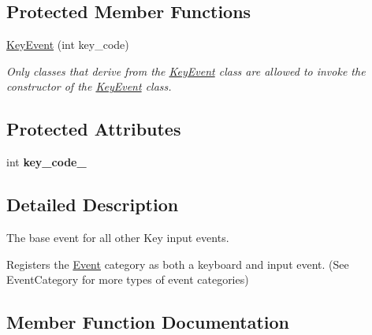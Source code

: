 \subsection*{Protected Member Functions}
\begin{DoxyCompactItemize}
\item 
\mbox{\label{classengine_1_1events_1_1KeyEvent_a621562a39051187801b6f7259542a04f}} 
\hyperlink{classengine_1_1events_1_1KeyEvent_a621562a39051187801b6f7259542a04f}{Key\+Event} (int key\+\_\+code)
\begin{DoxyCompactList}\small\item\em Only classes that derive from the \hyperlink{classengine_1_1events_1_1KeyEvent}{Key\+Event} class are allowed to invoke the constructor of the \hyperlink{classengine_1_1events_1_1KeyEvent}{Key\+Event} class. \end{DoxyCompactList}\end{DoxyCompactItemize}
\subsection*{Protected Attributes}
\begin{DoxyCompactItemize}
\item 
\mbox{\label{classengine_1_1events_1_1KeyEvent_addcbfb73fa603f77369b613d87d76875}} 
int {\bfseries key\+\_\+code\+\_\+}
\end{DoxyCompactItemize}


\subsection{Detailed Description}
The base event for all other Key input events. 

Registers the \hyperlink{classengine_1_1events_1_1Event}{Event} category as both a keyboard and input event. (See Event\+Category for more types of event categories) 

\subsection{Member Function Documentation}
\mbox{\label{classengine_1_1events_1_1KeyEvent_a2140c6615ec67c2f0cca0b1932968947}} 
